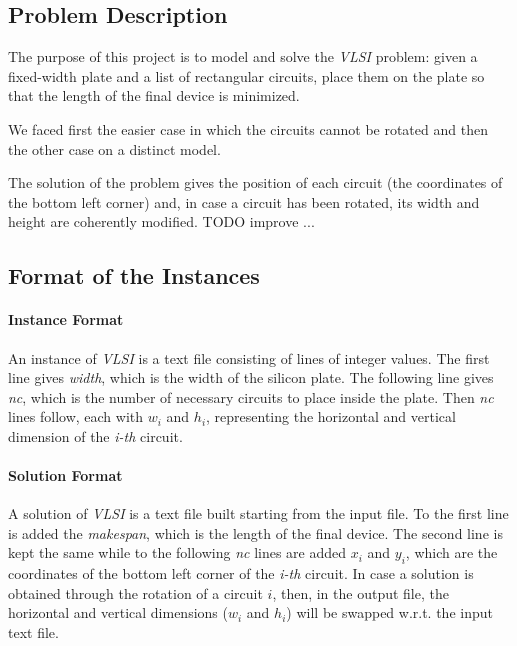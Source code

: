 \subsection{Problem Description} 
    The purpose of this project is to model and solve the \textit{VLSI} problem: given a fixed-width plate and a list of 
    rectangular circuits, place them on the plate so that the length of the final device is minimized. 
    
    We faced first the easier case in which the circuits cannot be rotated and then the other case on a distinct model.

    The solution of the problem gives the position of each circuit (the coordinates of the bottom left corner) and,
    in case a circuit has been rotated, its width and height are coherently modified.
    \colorbox{BurntOrange}{TODO improve ...}


\subsection{Format of the Instances}
    \paragraph*{Instance Format}
        An instance of \textit{VLSI} is a text file consisting of lines of integer values. The first line gives \textit{width}, 
        which is the width of the silicon plate. The following line gives \textit{nc}, which is the number of necessary circuits 
        to place inside the plate. Then \textit{nc} lines follow, each with $w_i$ and $h_i$, representing the horizontal and 
        vertical dimension of the \textit{i-th} circuit.

    \paragraph*{Solution Format}
        A solution of \textit{VLSI} is a text file built starting from the input file. To the first line is added the \textit{makespan},
        which is the length of the final device. The second line is kept the same while to the following \textit{nc} lines are added
        $x_i$ and $y_i$, which are the coordinates of the bottom left corner of the \textit{i-th} circuit. In case a solution is obtained 
        through the rotation of a circuit $i$, then, in the output file, the horizontal and vertical dimensions ($w_i$ and $h_i$) 
        will be swapped w.r.t. the input text file.

